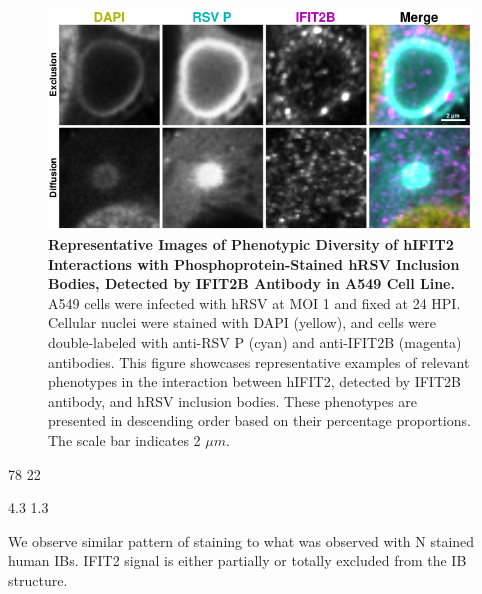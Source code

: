 \begin{figure}
    \centering
    \includegraphics[width=1\linewidth]{08. Chapter 3/Figs/02. Infection/02. IFIT2/02. IFIT2B/06. i2b a549 hrsv p.pdf} 
    \caption[Representative Images of Phenotypic Diversity of hIFIT2 Interactions with Phosphoprotein-Stained hRSV Inclusion Bodies, Detected by IFIT2B Antibody in A549 Cell Line.]{\textbf{Representative Images of Phenotypic Diversity of hIFIT2 Interactions with Phosphoprotein-Stained hRSV Inclusion Bodies, Detected by IFIT2B Antibody in A549 Cell Line.} A549 cells were infected with hRSV at MOI 1 and fixed at 24 HPI. Cellular nuclei were stained with DAPI (yellow), and cells were double-labeled with anti-RSV P (cyan) and anti-IFIT2B (magenta) antibodies. This figure showcases representative examples of relevant phenotypes in the interaction between hIFIT2, detected by IFIT2B antibody, and hRSV inclusion bodies. These phenotypes are presented in descending order based on their percentage proportions. The scale bar indicates 2 \(\mu m\).}
    \label{fig:Representative Images of Phenotypic Diversity of hIFIT2 Interactions with Phosphoprotein-Stained hRSV Inclusion Bodies, Detected by IFIT2B Antibody in A549 Cell Line}
\end{figure}

78 22

4.3 1.3

We observe similar pattern of staining to what was observed with N stained human IBs. IFIT2 signal is either partially or totally excluded from the IB structure.

